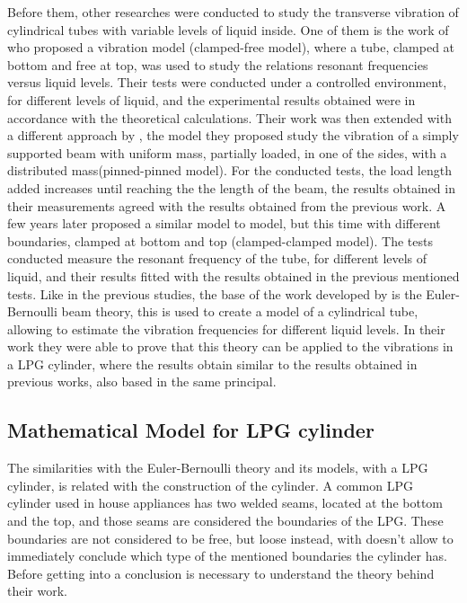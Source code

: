 Before them, other researches were conducted to study the transverse vibration of cylindrical tubes with variable levels of liquid inside. One of them is the work of \citeauthor{chanFreeVibrationCantilever1995} who proposed a vibration model (clamped-free model), where a tube, clamped at bottom and free at top, was used to study the relations resonant frequencies versus liquid levels. Their tests were conducted under a controlled environment, for different levels of liquid, and the experimental results obtained were in accordance with the theoretical calculations\cite{chanFreeVibrationCantilever1995}. 
Their work was then extended with a different approach by \citeauthor{chanFREEVIBRATIONSIMPLY1996}, the model they proposed study the vibration of a simply supported beam with uniform mass, partially loaded, in one of the sides, with a distributed mass(pinned-pinned model). For the conducted tests, the load length added increases until reaching the the length of the beam, the results obtained in their measurements agreed with the results obtained from the previous work\cite{chanFREEVIBRATIONSIMPLY1996}. 
A few years later \citeauthor{jacobsContactlessLiquidDetection2005} proposed a similar model to \citeauthor{chanFreeVibrationCantilever1995} model, but this time with different boundaries, clamped at bottom and top (clamped-clamped model). The tests conducted measure the resonant frequency of the tube, for different levels of liquid, and their results fitted with the results obtained in the previous mentioned tests\cite{jacobsContactlessLiquidDetection2005}.
Like in the previous studies, the base of the work developed by \citeauthor{wuLiquidLevelDetector2014b} is the Euler-Bernoulli beam theory\cite{raoMechanicalVibrations2017}\cite{thomsonTheoryVibrationApplications1996}, this is used to create a model of a cylindrical tube, allowing to estimate the vibration frequencies for different liquid levels. In their work they were able to prove that this theory can be applied to the vibrations in a LPG cylinder, where the results obtain similar to the results obtained in previous works, also based in the same principal.

\subsection{Mathematical Model for LPG cylinder}
The similarities with the Euler-Bernoulli theory and its models, with a LPG cylinder, is related with the construction of the cylinder. A common LPG cylinder used in house appliances has two welded seams, located at the bottom and the top, and those seams are considered the boundaries of the LPG. These boundaries are not considered to be free, but loose instead, with doesn't allow to immediately conclude which type of the mentioned boundaries the cylinder has. Before getting into a conclusion is necessary to understand the theory behind their work.

